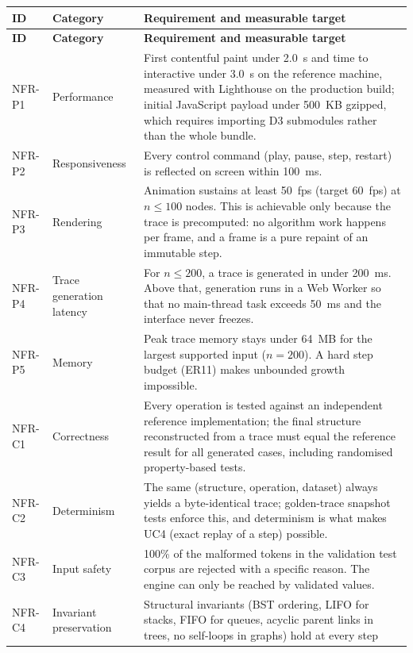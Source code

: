 \documentclass[11pt,a4paper]{article}
\begin{document}
{\footnotesize
\setlength{\tabcolsep}{3pt}
\begin{longtable}{@{}L{1.3cm}L{2.5cm}L{11.2cm}@{}}
\toprule
\textbf{ID} & \textbf{Category} & \textbf{Requirement and measurable target} \\
\midrule
\endfirsthead
\toprule
\textbf{ID} & \textbf{Category} & \textbf{Requirement and measurable target} \\
\midrule
\endhead
\bottomrule
\endlastfoot

NFR-P1 & Performance & First contentful paint under 2.0~s and time to interactive under
3.0~s on the reference machine, measured with Lighthouse on the production build; initial
JavaScript payload under 500~KB gzipped, which requires importing D3 submodules rather than
the whole bundle. \\
NFR-P2 & Responsiveness & Every control command (play, pause, step, restart) is reflected
on screen within 100~ms. \\
NFR-P3 & Rendering & Animation sustains at least 50~fps (target 60~fps) at $n \le 100$
nodes. This is achievable only because the trace is precomputed: no algorithm work happens
per frame, and a frame is a pure repaint of an immutable step. \\
NFR-P4 & Trace generation latency & For $n \le 200$, a trace is generated in under 200~ms.
Above that, generation runs in a Web Worker so that no main-thread task exceeds 50~ms and
the interface never freezes. \\
NFR-P5 & Memory & Peak trace memory stays under 64~MB for the largest supported input
($n = 200$). A hard step budget (ER11) makes unbounded growth impossible. \\
NFR-C1 & Correctness & Every operation is tested against an independent reference
implementation; the final structure reconstructed from a trace must equal the reference
result for all generated cases, including randomised property-based tests. \\
NFR-C2 & Determinism & The same (structure, operation, dataset) always yields a
byte-identical trace; golden-trace snapshot tests enforce this, and determinism is what
makes UC4 (exact replay of a step) possible. \\
NFR-C3 & Input safety & 100\% of the malformed tokens in the validation test corpus are
rejected with a specific reason. The engine can only be reached by validated values. \\
NFR-C4 & Invariant preservation & Structural invariants (BST ordering, LIFO for stacks,
FIFO for queues, acyclic parent links in trees, no self-loops in graphs) hold at every step

\end{longtable}}
\end{document}
